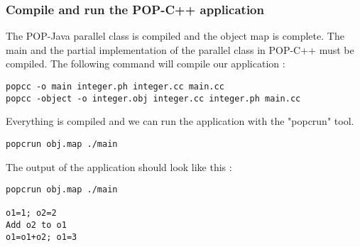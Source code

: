 \subsubsection{Compile and run the POP-C++ application}
The POP-Java parallel class is compiled and the object map is complete. The main and the partial implementation of the parallel class in POP-C++ must be compiled. The following command will compile our application : 

\begin{lstlisting}
popcc -o main integer.ph integer.cc main.cc
popcc -object -o integer.obj integer.cc integer.ph main.cc
\end{lstlisting}\s

Everything is compiled and we can run the application with the "popcrun" tool.
\begin{lstlisting}
popcrun obj.map ./main
\end{lstlisting}\s

The output of the application should look like this :
\begin{lstlisting}
popcrun obj.map ./main

o1=1; o2=2
Add o2 to o1
o1=o1+o2; o1=3
\end{lstlisting}





